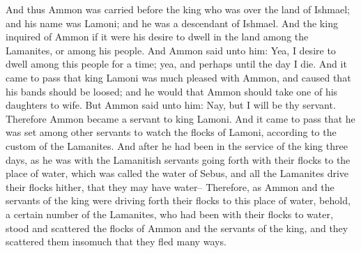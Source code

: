 And thus Ammon was carried before the king who was over the land of Ishmael; and his name was Lamoni; and he was a descendant of Ishmael.
\bverse \iffalse And the king inquired of Ammon if it were his desire to dwell in the land among the Lamanites, or among his people. \fi
And the king inquired of Ammon if it were his desire to dwell in the land among the Lamanites, or among his people.
\bverse \iffalse And Ammon said unto him: Yea, I desire to dwell among this people for a time; yea, and perhaps until the day I die. \fi
And Ammon said unto him: Yea, I desire to dwell among this people for a time; yea, and perhaps until the day I die.
\bverse \iffalse And it came to pass that king Lamoni was much pleased with Ammon, and caused that his bands should be loosed; and he would that Ammon should take one of his daughters to wife. \fi
And it came to pass that king Lamoni was much pleased with Ammon, and caused that his bands should be loosed; and he would that Ammon should take one of his daughters to wife.
\bverse \iffalse But Ammon said unto him: Nay, but I will be thy servant.  Therefore Ammon became a servant to king Lamoni. And it came to pass that he was set among other servants to watch the flocks of Lamoni, according to the custom of the Lamanites. \fi
But Ammon said unto him: Nay, but I will be thy servant.  Therefore Ammon became a servant to king Lamoni. And it came to pass that he was set among other servants to watch the flocks of Lamoni, according to the custom of the Lamanites.
\bverse \iffalse And after he had been in the service of the king three days, as he was with the Lamanitish servants going forth with their flocks to the place of water, which was called the water of Sebus, and all the Lamanites drive their flocks hither, that they may have water-- \fi
And after he had been in the service of the king three days, as he was with the Lamanitish servants going forth with their flocks to the place of water, which was called the water of Sebus, and all the Lamanites drive their flocks hither, that they may have water--
\bverse \iffalse Therefore, as Ammon and the servants of the king were driving forth their flocks to this place of water, behold, a certain number of the Lamanites, who had been with their flocks to water, stood and scattered the flocks of Ammon and the servants of the king, and they scattered them insomuch that they fled many ways. \fi
Therefore, as Ammon and the servants of the king were driving forth their flocks to this place of water, behold, a certain number of the Lamanites, who had been with their flocks to water, stood and scattered the flocks of Ammon and the servants of the king, and they scattered them insomuch that they fled many ways.
